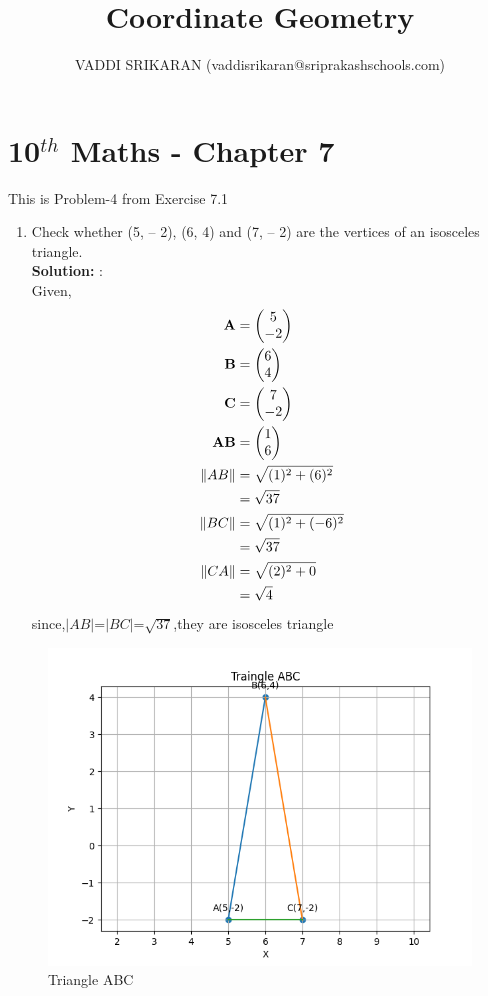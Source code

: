 \documentclass[12pt]{article}
\title{Coordinate Geometry}
\author{VADDI SRIKARAN (vaddisrikaran@sriprakashschools.com)}
\newcommand{\myvec}[1]{\ensuremath{\begin{pmatrix}#1\end{pmatrix}}}
\newcommand{\solution}{\noindent \textbf{Solution: }}
\let\vec\mathbf
\begin{document}
\maketitle
\section*{10$^{th}$ Maths - Chapter 7}
This is Problem-4 from Exercise 7.1
\begin{enumerate}
\item Check whether (5, – 2), (6, 4) and (7, – 2) are the vertices of an isosceles triangle. \\
\solution:\\
Given,
\begin{align}
\vec{A}&=\myvec{5\\-2}\\
\vec{B}&=\myvec{6\\4}\\
\vec{C}&=\myvec{7\\-2}\\
\vec{AB}&=\myvec{1\\6}\\
\norm{AB}&=\sqrt{(1)^2+(6)^2}\\
&=\sqrt{37}\\
\norm{BC}&=\sqrt{(1)^2+(-6)^2}\\
&=\sqrt{37}\\
\norm{CA}&=\sqrt{(2)^2+0}\\
&=\sqrt{4}\\
\end{align}
since,$|AB|$=$|BC|$=$\sqrt{37}$,they are isosceles triangle
\end{enumerate}
\begin{figure}[H]
			\centering
			\includegraphics[width=\columnwidth]{figs/Figure_1.png}
			\caption{Triangle ABC}
			\label{fig:10}
   \end{figure}
\end{document}
